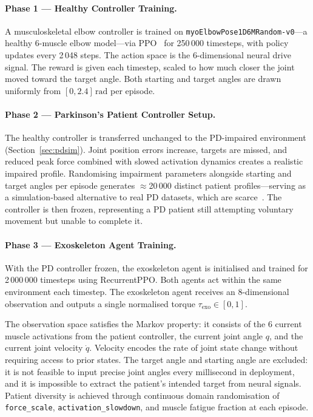 \documentclass{article}
\begin{document}
\paragraph{Phase 1 --- Healthy Controller Training.}
A musculoskeletal elbow controller is trained on
\texttt{myoElbowPose1D6MRandom-v0}---a healthy 6-muscle elbow model---via
PPO~\citep{sb3} for 250\,000 timesteps, with policy updates every
2\,048 steps. The action space is the 6-dimensional neural drive signal.
The reward is given each timestep, scaled to how much closer the joint
moved toward the target angle. Both starting and target angles are drawn
uniformly from $[0, 2.4]\,\mathrm{rad}$ per episode.

\paragraph{Phase 2 --- Parkinson's Patient Controller Setup.}
The healthy controller is transferred unchanged to the PD-impaired
environment (Section~\ref{sec:pdsim}). Joint position errors increase,
targets are missed, and reduced peak force combined with slowed activation
dynamics creates a realistic impaired profile. Randomising impairment
parameters alongside starting and target angles per episode generates
$\approx$20\,000 distinct patient profiles---serving as a
simulation-based alternative to real PD datasets, which are
scarce~\citep{researchgate2023, arxiv2025}. The controller is then frozen,
representing a PD patient still attempting voluntary movement but unable
to complete it.

\paragraph{Phase 3 --- Exoskeleton Agent Training.}
With the PD controller frozen, the exoskeleton agent is initialised and
trained for 2\,000\,000 timesteps using RecurrentPPO. Both agents act
within the same environment each timestep. The exoskeleton agent receives
an 8-dimensional observation and outputs a single normalised torque
$\tau_\text{exo} \in [0,1]$.

The observation space satisfies the Markov property: it consists of the
6 current muscle activations from the patient controller, the current
joint angle $q$, and the current joint velocity $\dot{q}$. Velocity
encodes the rate of joint state change without requiring access to prior
states. The target angle and starting angle are excluded: it is not
feasible to input precise joint angles every millisecond in deployment,
and it is impossible to extract the patient's intended target from neural
signals. Patient diversity is achieved through continuous domain
randomisation of \texttt{force\_scale}, \texttt{activation\_slowdown},
and muscle fatigue fraction at each episode.
\end{document}
